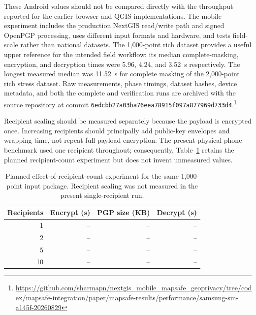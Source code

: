 \documentclass[a4paper,UKenglish,cleveref,autoref,thm-restate]{lipics-v2021}
\begin{document}
These Android values should not be compared directly with the throughput reported for the earlier browser and QGIS implementations. The mobile experiment includes the production NextGIS read/write path and signed OpenPGP processing, uses different input formats and hardware, and tests field-scale rather than national datasets. The 1,000-point rich dataset provides a useful upper reference for the intended field workflow: its median complete-masking, encryption, and decryption times were 5.96, 4.24, and 3.52~s respectively. The longest measured median was 11.52~s for complete masking of the 2,000-point rich stress dataset. Raw measurements, phase timings, dataset hashes, device metadata, and both the complete and verification runs are archived with the source repository at commit \texttt{6edcbb27a03ba76eea78915f097a877969d733d4}.\footnote{\url{https://github.com/sharmapn/nextgis_mobile_mapsafe_geoprivacy/tree/codex/mapsafe-integration/paper/mapsafe-results/performance/samsung-sm-a145f-20260829}}

Recipient scaling should be measured separately because the payload is encrypted once. Increasing recipients should principally add public-key envelopes and wrapping time, not repeat full-payload encryption. The present physical-phone benchmark used one recipient throughout; consequently, Table~\ref{tab:recipient-scaling} retains the planned recipient-count experiment but does not invent unmeasured values.

\begin{table}[t]
\centering
\caption{Planned effect-of-recipient-count experiment for the same 1,000-point input package. Recipient scaling was not measured in the present single-recipient run.}
\label{tab:recipient-scaling}
\small
\begin{tabular}{rrrr}
\toprule
\textbf{Recipients} & \textbf{Encrypt (s)} & \textbf{PGP size (KB)} & \textbf{Decrypt (s)} \\
\midrule
1  & -- & -- & -- \\
2  & -- & -- & -- \\
5  & -- & -- & -- \\
10 & -- & -- & -- \\
\bottomrule
\end{tabular}
\end{table}
\end{document}

